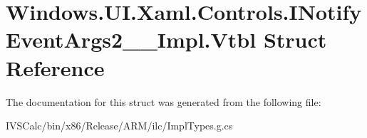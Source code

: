 \hypertarget{struct_windows_1_1_u_i_1_1_xaml_1_1_controls_1_1_i_notify_event_args2_____impl_1_1_vtbl}{}\section{Windows.\+U\+I.\+Xaml.\+Controls.\+I\+Notify\+Event\+Args2\+\_\+\+\_\+\+Impl.\+Vtbl Struct Reference}
\label{struct_windows_1_1_u_i_1_1_xaml_1_1_controls_1_1_i_notify_event_args2_____impl_1_1_vtbl}


The documentation for this struct was generated from the following file\+:\begin{DoxyCompactItemize}
\item 
I\+V\+S\+Calc/bin/x86/\+Release/\+A\+R\+M/ilc/Impl\+Types.\+g.\+cs\end{DoxyCompactItemize}
